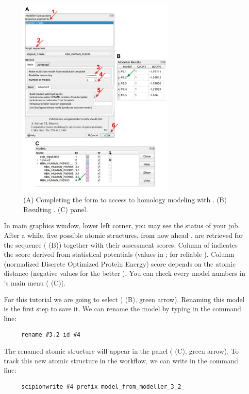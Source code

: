   \begin{figure}[H]
  \centering 
  \captionsetup{width=.9\linewidth} 
  \includegraphics[width=0.7\textwidth]{Images/Fig15}
  \caption{(A) Completing the form to access to homology modeling with \modeller. (B) Resulting . (C) \chimera {} panel.}
  \label{fig:modeller}
  \end{figure}

In \chimera main graphics window, lower left corner, you may see the status of your job. After a while, five possible atomic structures, from now ahead , are retrieved for the  sequence ( (B)) together with their assessment scores. Column  of  indicates the score derived from statistical potentials (values in \ttt{[0,1]};  for reliable ). Column  (normalized Discrete Optimized Protein Energy) score depends on the atomic distance (negative values for the better ). You can check every model numbers in \chimera's main menu ( (C)).

For this tutorial we are going to select    ( (B), green arrow). Renaming this model is the first step to save it. We can rename the model by typing in the \chimera command line:
 \begin{verbatim}
     rename #3.2 id #4
 \end{verbatim}
The renamed atomic structure will appear in the  panel ( (C), green arrow). To track this new atomic structure in the \scipion workflow, we can write in the \chimera command line:
\begin{verbatim}
     scipionwrite #4 prefix model_from_modeller_3_2_
 \end{verbatim}
 
